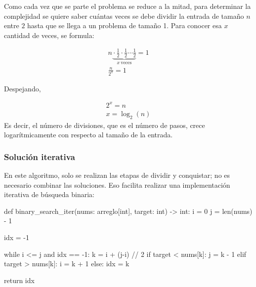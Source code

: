 Como cada vez que se parte el problema se reduce a la mitad, para determinar la complejidad se quiere saber cuántas veces se debe dividir la entrada de tamaño $n$ entre $2$ hasta que se llega a un problema de tamaño 1. Para conocer esa $x$ cantidad de veces, se formula:

\begin{gather*}
  n \underbrace{{} \cdot \frac{1}{2} \cdot \frac{1}{2} \cdots \frac{1}{2}}_{x \ \text{veces}} = 1 \\
  \frac{n}{2^x} = 1
\end{gather*}

Despejando,

\begin{gather*}
  2^x = n \\
  x = \log_2(n)
\end{gather*}
Es decir, el número de divisiones, que es el número de pasos, crece logarítmicamente con respecto al tamaño de la entrada.

\subsubsection{Solución iterativa}

En este algoritmo, solo se realizan las etapas de dividir y conquistar; no es necesario combinar las soluciones. Eso facilita realizar una implementación iterativa de búsqueda binaria:
\begin{pseudocode}
def binary_search_iter(nums: arreglo[int], target: int) -> int:
    i = 0
    j = len(nums) - 1
    
    idx = -1

    while i <= j and idx == -1:
        k = i + (j-i) // 2
        if target < nums[k]:
            j = k - 1
        elif target > nums[k]:
            i = k + 1
        else:
            idx = k
        
    return idx
\end{pseudocode}




